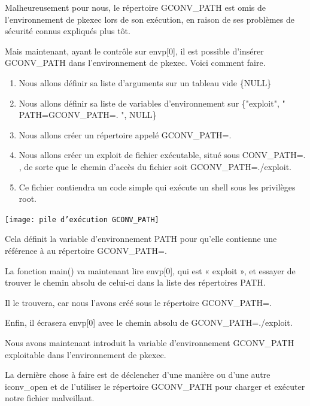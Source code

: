\documentclass[12pt,a4paper]{article}
\begin{document}
\begin{flushleft}
            \item Malheureusement pour nous, le répertoire GCONV\_PATH est omis de l’environnement de pkexec lors de son exécution, en raison de ses problèmes de sécurité connus expliqués plus tôt.
            \item Mais maintenant, ayant le contrôle sur envp[0], il est possible d'insérer GCONV\_PATH dans l'environnement de pkexec. Voici comment faire.
            \begin{enumerate}
                \item Nous allons définir sa liste d’arguments sur un tableau vide \{NULL\}
                \item Nous allons définir sa liste de variables d’environnement sur \{"exploit", " PATH=GCONV\_PATH=. ", NULL\}
                \item Nous allons créer un répertoire appelé GCONV\_PATH=.
                \item Nous allons créer un exploit de fichier exécutable, situé sous CONV\_PATH=. , de sorte que le chemin d’accès du fichier soit GCONV\_PATH=./exploit.
                \item Ce fichier contiendra un code simple qui exécute un shell sous les privilèges root.
            \end{enumerate}
            \begin{center}
                \texttt{[image: pile d'exécution GCONV\_PATH]} \cite{CVE2021425}
            \end{center}
            \item Cela définit la variable d’environnement PATH pour qu’elle contienne une référence à au répertoire GCONV\_PATH=. 
            \item La fonction main() va maintenant lire envp[0], qui est « exploit », et essayer de trouver le chemin absolu de celui-ci dans la liste des répertoires PATH. 
            \item Il le trouvera, car nous l’avons créé sous le répertoire GCONV\_PATH=. 
            \item Enfin, il écrasera envp[0] avec le chemin absolu de GCONV\_PATH=./exploit.
            \item Nous avons maintenant introduit la variable d’environnement GCONV\_PATH exploitable dans l’environnement de pkexec. 
            \item La dernière chose à faire est de déclencher d’une manière ou d’une autre iconv\_open et de l’utiliser le répertoire GCONV\_PATH pour charger et exécuter notre fichier malveillant.

\end{flushleft}
\end{document}
